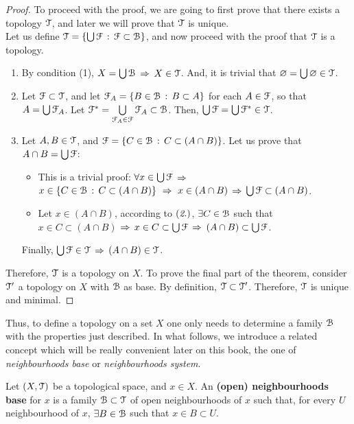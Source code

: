 \begin{proof}
	To proceed with the proof, we are going to first prove that there exists a topology $\EuScript{T}$, and later
	we will prove that $\EuScript{T}$ is unique.\\
	Let us define $\EuScript{T} = \{\bigcup \EuScript{F}\,:\,\EuScript{F}\subset \EuScript{B}\}$, and now proceed with the proof
	that $\EuScript{T}$ is a topology.
	\begin{enumerate}
		\item By condition (1), $X=\bigcup \EuScript{B}$ $\Rightarrow$ $X\in \EuScript{T}$.
		And, it is trivial that $\varnothing = \bigcup \varnothing \in \EuScript{T}$.

		\item Let $\EuScript{F}\subset \EuScript{T}$, and let $\EuScript{F}_A=\{B\in \EuScript{B}\,:\, B\subset A\}$ for each
		$A\in\EuScript{F}$, so that $A=\bigcup\EuScript{F}_A$.
		Let $\EuScript{F}^*=\bigcup\limits_{\EuScript{F}_A\in\EuScript{F}}\EuScript{F}_A\subset\EuScript{B}$.
		Then,  $\bigcup \EuScript{F} =\bigcup\EuScript{F}^*\in\EuScript{T}$.

		\item Let $A, B\in \EuScript{T}$, and $\EuScript{F} = \{C\in\EuScript{B}\,:\, C \subset(A\cap B)\}$.
		Let us prove that $A\cap B = \bigcup\EuScript{F}$:
		\begin{itemize}
			\item[\boxed{\supseteq}] This is a trivial proof: $\forall x\in\bigcup\EuScript{F}$ $\Rightarrow$
			$x\in\left\{C\in\EuScript{B}\,:\,C\subset(A\cap B)\right\}\ \Rightarrow\ x\in (A\cap B)$ $\Rightarrow$
			$\bigcup\EuScript{F} \subset (A\cap B)$.
			\item[\boxed{\subseteq}] Let $x\in (A\cap B)$, according to $(\emph{2.})$,
			$\exists C\in \EuScript{B}$ such that $x\in C\subset (A\cap B)$ $\Rightarrow$ $x\in C\subset
			\bigcup\EuScript{F}$ $\Rightarrow$ $(A\cap B)\subset \bigcup\EuScript{F}$.
		\end{itemize}
		Finally, $\bigcup \EuScript{F}\in \EuScript{T}$ $\Rightarrow$ $(A\cap B) \in \EuScript{T}$.
	\end{enumerate}
	Therefore, $\EuScript{T}$ is a topology on $X$.
	To prove the final part of the theorem, consider $\EuScript{T}'$ a topology on $X$ with
	$\EuScript{B}$ as base.
	By definition, $\EuScript{T}\subset \EuScript{T}'$.
	Therefore, $\EuScript{T}$ is unique and minimal.
\end{proof}

Thus, to define a topology on a set $X$ one only needs to determine a family $\EuScript{B}$ with
the properties just described.
In what follows, we introduce a related concept which
will be really convenient later on this book, the one of \emph{neighbourhoods base} or
\emph{neighbourhoods system}.

\begin{definition}
	\label{def:neighbourhoods-base}
	Let $(X, \EuScript{T})$ be a topological space, and $x\in X$.
	An \textbf{(open) neighbourhoods base} for $x$ is a family $\EuScript{B}\subset\EuScript{T}$ of open
	neighbourhoods of $x$ such that, for every $U$ neighbourhood of $x$, $\exists B\in\EuScript{B}$ such that
	$x\in B\subset U$.
\end{definition}

